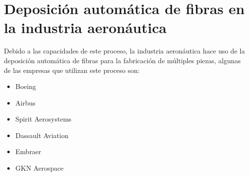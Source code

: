 \section{Deposición automática de fibras en la industria aeronáutica}
Debido a las capacidades de este proceso, la industria aeronáutica hace uso de la deposición automática de fibras para la fabricación de múltiples piezas, algunas de las empresas que utilizan este proceso son:
\begin{itemize}
    \item Boeing
    \item Airbus
    \item Spirit Aerosystems
    \item Dassault Aviation
    \item Embraer
    \item GKN Aerospace
\end{itemize}




\textbf{}